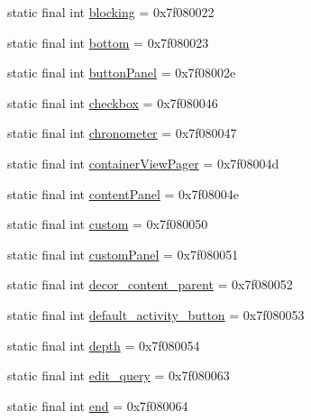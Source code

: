 \begin{DoxyCompactItemize}
static final int \mbox{\hyperlink{classcom_1_1synnapps_1_1carouselview_1_1_r_1_1id_aafcba51137f6801a670d033138ea79bc}{blocking}} = 0x7f080022
\item 
static final int \mbox{\hyperlink{classcom_1_1synnapps_1_1carouselview_1_1_r_1_1id_ade195cb43297c660f4605ecacfd8093a}{bottom}} = 0x7f080023
\item 
static final int \mbox{\hyperlink{classcom_1_1synnapps_1_1carouselview_1_1_r_1_1id_af4950f87776c468460507aab45d9c0c6}{button\+Panel}} = 0x7f08002e
\item 
static final int \mbox{\hyperlink{classcom_1_1synnapps_1_1carouselview_1_1_r_1_1id_a3d79a51879e7bcf8c7d735561028c9a3}{checkbox}} = 0x7f080046
\item 
static final int \mbox{\hyperlink{classcom_1_1synnapps_1_1carouselview_1_1_r_1_1id_a3e39f0858d0786baa715662366dd7603}{chronometer}} = 0x7f080047
\item 
static final int \mbox{\hyperlink{classcom_1_1synnapps_1_1carouselview_1_1_r_1_1id_a8a6f1ccee207b944b72dd2493f7a5511}{container\+View\+Pager}} = 0x7f08004d
\item 
static final int \mbox{\hyperlink{classcom_1_1synnapps_1_1carouselview_1_1_r_1_1id_a4e288de3357b62e8b6f8f0326c8ec887}{content\+Panel}} = 0x7f08004e
\item 
static final int \mbox{\hyperlink{classcom_1_1synnapps_1_1carouselview_1_1_r_1_1id_ae318ca05c36b61f80bcb72d130ff644d}{custom}} = 0x7f080050
\item 
static final int \mbox{\hyperlink{classcom_1_1synnapps_1_1carouselview_1_1_r_1_1id_ad071dc506c952f537a8da8155f1601ae}{custom\+Panel}} = 0x7f080051
\item 
static final int \mbox{\hyperlink{classcom_1_1synnapps_1_1carouselview_1_1_r_1_1id_ab5462acd04a2b406cde23f7d31b90077}{decor\+\_\+content\+\_\+parent}} = 0x7f080052
\item 
static final int \mbox{\hyperlink{classcom_1_1synnapps_1_1carouselview_1_1_r_1_1id_a4d6edeee30ec885e12e630932323eebd}{default\+\_\+activity\+\_\+button}} = 0x7f080053
\item 
static final int \mbox{\hyperlink{classcom_1_1synnapps_1_1carouselview_1_1_r_1_1id_a0c43a82e175b4620aaffbd63fcf7c2ea}{depth}} = 0x7f080054
\item 
static final int \mbox{\hyperlink{classcom_1_1synnapps_1_1carouselview_1_1_r_1_1id_aeaed825460b674fed20867dbb8eeb7d7}{edit\+\_\+query}} = 0x7f080063
\item 
static final int \mbox{\hyperlink{classcom_1_1synnapps_1_1carouselview_1_1_r_1_1id_a83644c403d3cb9f245850a3ff236c46b}{end}} = 0x7f080064

\end{DoxyCompactItemize}
